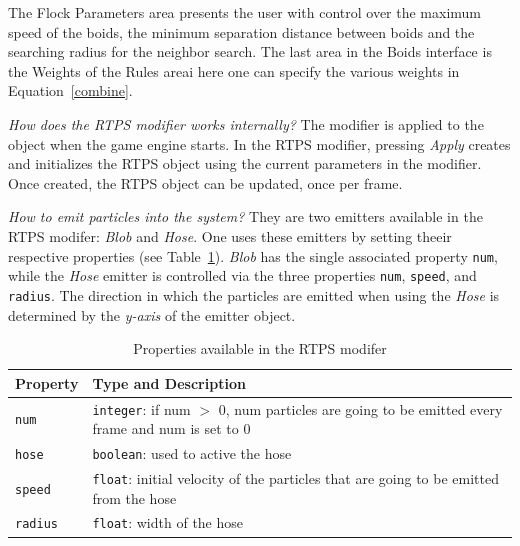 The Flock Parameters area presents the user with control over the maximum speed of the boids, the minimum separation distance between boids and the searching radius for the neighbor search. The last area in the Boids interface is the Weights of the Rules areai here one can specify the various weights in  
Equation~\ref{combine}.

\textit{How does the RTPS modifier works internally?} The modifier is applied to the object when the game engine starts. In the RTPS modifier, pressing \textit{Apply} creates and initializes the RTPS object using the current parameters in the modifier. Once created, the RTPS object can be updated, once per frame. 

\textit{How to emit particles into the system?} They are two emitters available in the RTPS modifer: \textit{Blob} and \textit{Hose}. One uses these emitters by setting theeir respective properties (see Table~\ref{properties}). \textit{Blob} has the single associated property \texttt{num}, while the \textit{Hose} emitter is controlled via the three properties \texttt{num}, \texttt{speed}, and \texttt{radius}. The direction in which the particles are emitted when using the \textit{Hose} is determined by the \textit{y-axis} of the emitter object. 

\begin{table}[htdp]
\caption{Properties available in the RTPS modifer}
\begin{center}
\begin{tabular}{|p{3cm}|p{9cm}|}
\hline 
\textbf{Property} & \textbf{Type and Description} \\\hline 
\texttt{num} 	& \texttt{integer}: if num $>$ 0, num particles are going to be emitted every frame and num is set to 0	\\\hline 
\texttt{hose}	& \texttt{boolean}: used to active the hose	\\\hline
\texttt{speed}	& \texttt{float}: initial velocity of the particles that are going to be emitted from the hose	\\\hline
\texttt{radius}	& \texttt{float}: width of the hose	\\ %
\hline 
\end{tabular}
\end{center}
\label{properties}
\end{table}

